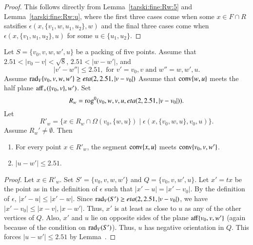 \begin{tarskidata}
\begin{tarski}
\begin{proof}  This follows directly from Lemma~\ref{tarski:fine:Rw:5}
and Lemma~\ref{tarski:fine:Rw:u}, where the first three cases
come when some $x\in F\cap R$ satsifies
  $\epsilon(x,\{v_1,w,u_1,u_2\},w)$ and the final three cases
come when $\epsilon(x,\{v_1,u_1,u_2\},u)$ for some $u\in \{u_1,u_2\}$.
\end{proof}
\end{tarski}






\begin{tarski}

\begin{lemma}
Let $S=\{v_0,v,w,w',u\}$ be a packing of five points.
Assume that $2.51<|v_0-v|<\sqrt8$, $2.51<|w-w'|$, and
  $$
  |v'-w''| \le 2.51, \text{ for } v'=v_0,v \text{ and } w''=w,w',u.
  $$
Assume $\operatorname{rad}_V\{v_0,v,w,w'\}\ge eta(2,2.51,|v-v_0|)$
Assume that ${\operatorname{conv}}\{w,u\}$ meets the
half plane ${\operatorname{aff}}_+(\{v_0,v\},w')$.
Set
  $$R_w={\operatorname{rog}}^0(v_0,w,v,u,eta(2,2.51,|v-v_0|)).$$
Let 
   $$R'_w = \{x\in R_w \cap\Omega(v_0,\{w,u\}) \mid
     \epsilon(x,\{v_0,w,u\},v_0,u)\}.$$
Assume $R_w'\ne \emptyset$.
Then
\begin{enumerate}
 \item  For every point $x\in R'_w$, the segment ${\operatorname{conv}}\{x,u\}$ meets
  ${\operatorname{conv}}\{v_0,v,w'\}$.
\item $|u-w'|\le 2.51$.
\end{enumerate}
\end{lemma}

\begin{proof} 
Let $x\in R'_w$. Set $S'=\{v_0,v,w,w'\}$ and $Q=\{v_0,v,w',u\}$.
Let $x' = t x$ be the point as in the definition of $\epsilon$ such
that $|x'-u|=|x'-v_0|$.  By the definition of $\epsilon$,
$|x'-u| \le |x'-w|$.  Since $\operatorname{rad}_V(S')\ge eta(2,2.51,|v-v_0|)$, we have
$|x'-v_0| \le |x-v|,|x-w'|$.  Thus, $x'$ is at least as close to $u$
as any of the other vertices of $Q$.  Also, $x'$
and $u$ lie on opposite sides of the plane ${\operatorname{aff}}\{v_0,v,w'\}$
(again because of the condition on $\operatorname{rad}_V(S')$).  Thus, $u$ has
negative orientation in $Q$.  This forces 
$|u-w'|\le 2.51$ by Lemma~.


\end{proof}
\end{tarski}
\end{tarskidata}
